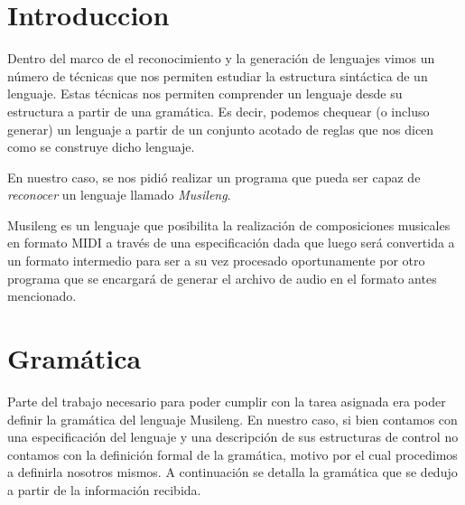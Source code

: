\section{Introduccion}

Dentro del marco de el reconocimiento y la generación de lenguajes vimos un número de técnicas que nos permiten
estudiar la estructura sintáctica de un lenguaje. Estas técnicas nos permiten
comprender un lenguaje desde su estructura a partir de una gramática. Es decir, podemos chequear (o incluso generar)
un lenguaje a partir de un conjunto acotado de reglas que nos dicen como se construye dicho lenguaje.

En nuestro caso, se nos pidió realizar un programa que pueda ser capaz de \emph{reconocer} un lenguaje llamado \emph{Musileng}.

Musileng es un lenguaje que posibilita la realización de composiciones musicales en formato MIDI a través de una especificación dada que luego
será convertida a un formato intermedio para ser a su vez procesado oportunamente por otro programa que se encargará de generar el archivo
de audio en el formato antes mencionado.

\section{Gramática}

Parte del trabajo necesario para poder cumplir con la tarea asignada era poder definir la gramática del lenguaje Musileng.
En nuestro caso, si bien contamos con una especificación del lenguaje y una descripción de sus estructuras de control no contamos con la definición
formal de la gramática, motivo por el cual procedimos a definirla nosotros mismos. A continuación se detalla la gramática que
se dedujo a partir de la información recibida.

